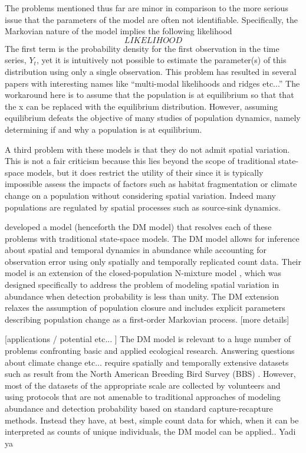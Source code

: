\documentclass[12pt]{article}
\begin{document}
The problems mentioned thus far are minor in comparison to the more
serious issue that the parameters of the model are often not
identifiable. Specifically, the Markovian nature of the model implies
the following likelihood
\[
LIKELIHOOD
\]
The first term is the probability density for the first observation in
the time series, $Y_t$, yet it is intuitively not possible to estimate the
parameter(s) of this distribution using only a single
observation. This problem has resulted in several papers with
interesting names like ``multi-modal likelihoods and ridges etc...''
The workaround here is to assume that the population is at equilibrium
so that that the x can be replaced with the equilibrium
distribution. However, assuming equilibrium defeats the objective of
many studies of population dynamics, namely determining if and why a
population is at equilibrium.

A third problem with these models is that they do not admit
spatial variation. This is not a fair criticism because this
lies beyond the scope of traditional state-space models, but
it does restrict the utility of their since it is typically
impossible assess the impacts of factors such as habitat
fragmentation or climate change on a population without
considering spatial variation. Indeed many populations are
regulated by spatial processes such as source-sink dynamics.

\citet{dail_madsen:2011} developed a model (henceforth the DM model)
that resolves each of these problems with traditional state-space
models. The DM model allows for inference about spatial and temporal
dynamics in abundance while accounting for observation error using
only spatially and temporally replicated count data.  Their model is
an extension of the closed-population N-mixture model
\citep{royle:2004biom}, which was designed specifically to address the
problem of
modeling spatial variation in abundance when detection probability is
less than unity. The DM extension relaxes the assumption of population
closure and includes explicit parameters describing population change
as a first-order Markovian process. [more details]

[applications / potential etc... ] The DM model is relevant to a huge
number of problems confronting basic and applied ecological
research. Answering questions about climate change etc... require
spatially and temporally extensive datasets such as result from the
North American Breeding Bird Survey (BBS)
\citep{robbins_etal:1986}. However, most of the datasets of the
appropriate scale are
collected by volunteers and using protocols that are not amenable to
traditional approaches of modeling abundance and detection probability
based on standard capture-recapture methods. Instead they have, at
best, simple count data for which, when it can be interpreted as
counts of unique individuals, the DM model can be applied.. Yadi ya
\end{document}

